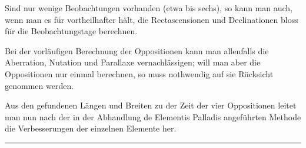 Sind nur wenige Beobachtungen vorhanden (etwa bis sechs), so kann man auch, wenn man es für vortheilhafter hält, die Rectascensionen und Declinationen bloss für die Beobachtungstage berechnen.

Bei der vorläufigen Berechnung der Oppositionen kann man allenfalls die Aberration, Nutation und Parallaxe vernachlässigen; will man aber die Oppositionen nur einmal berechnen, so muss nothwendig auf sie Rücksicht genommen werden.

Aus den gefundenen Längen und Breiten zu der Zeit der vier Oppositionen leitet man nun nach der in der Abhandlung de Elementis Palladis angeführten Methode die Verbesserungen der einzelnen Elemente her.

\par\medskip\begin{center}\rule{.22\textwidth}{.3pt}\end{center}
